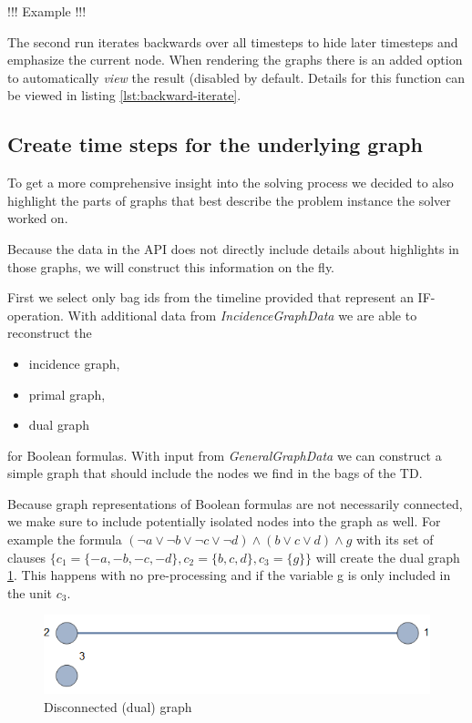 \documentclass[a4paper, 12pt]{scrartcl}
\begin{document}
!!! Example !!!

The second run iterates backwards over all timesteps to hide later timesteps and emphasize the current node.
When rendering the graphs there is an added option to automatically \textit{view} the result (disabled by default. Details for this function can be viewed in listing \ref{lst:backward-iterate}.

\subsection{Create time steps for the underlying graph}
To get a more comprehensive insight into the solving process we decided to also highlight the parts of graphs that best describe the problem instance the solver worked on.

Because the data in the API does not directly include details about highlights in those graphs, we will construct this information on the fly.

First we select only bag ids from the timeline provided that represent an IF-operation.
With additional data from \textit{IncidenceGraphData} we are able to reconstruct the
\begin{itemize}
	\item incidence graph,
	\item primal graph,
	\item dual graph
\end{itemize}
for Boolean formulas.
With input from \textit{GeneralGraphData} we can construct a simple graph that should include the nodes we find in the bags of the TD.

Because graph representations of Boolean formulas are not necessarily connected, we make sure to include potentially isolated nodes into the graph as well.
For example the formula $(\neg a\lor \neg b\lor \neg c\lor \neg d)\land (b\lor c\lor d)\land g$
with its set of clauses $\{c_{1}=\{-a,-b,-c,-d\},c_{2}=\{b,c,d\},c_{3}=\{g\}\}$ will create the dual graph \ref{fig:disconnected123}. This happens with no pre-processing and if the variable g is only included in the unit $c_{3}$.

\begin{figure}
	\centering
	\includegraphics{images/disconnected123.png}
	\caption{Disconnected (dual) graph}
	\label{fig:disconnected123}
\end{figure}
\end{document}
